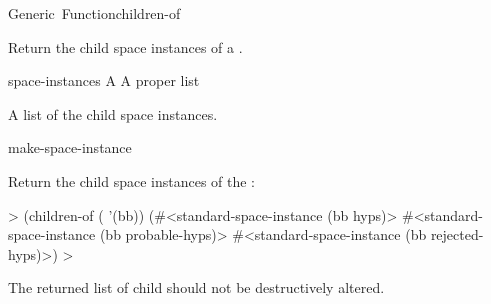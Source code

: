 \documentclass[10pt,twoside,english,pdftex]{article}
\begin{document}
\begin{functiondoc}{Generic~Function}{children-of}%
  {
    \returns{} }
%

\fnsyntax

\fnpurpose Return the child space instances of a .

\fnmethods
{}%
  {\code{(} 
    \returns{} }

\fnpackage {}

\fnmodule {}

\fnargs
\begin{args}{space-instances}
 A 
 A proper list
\end{args}

\fnreturns A list of the child space instances.

\begin{alsos}{make-space-instance}
\also[parent-of]
\end{alsos}

\fnexample
{}%
Return the child space instances  of the  :
%
\W\supp
\begin{example}
  > (children-of ( '(bb))
  (#<standard-space-instance (bb hyps)>
   #<standard-space-instance (bb probable-hyps)>
   #<standard-space-instance (bb rejected-hyps)>)
  >
\end{example}

\fnnote The returned list of child  should not be
destructively altered.

\end{functiondoc}

\end{document}

